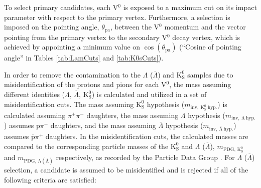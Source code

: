\documentclass[ALICE,manyauthors]{cernphprep}
\newcommand{\Lam}{$\Lambda$\xspace}
\newcommand{\ALam}{$\overline{\Lambda}$\xspace}
\newcommand{\LamALam}{$\Lambda$ ($\overline{\Lambda}$)\xspace}
\newcommand{\Ks}{$\mathrm{K^{0}_{S}}$\xspace}
\newcommand{\Vz}{V$^{0}$\xspace}
\begin{document}
To select primary candidates, each \Vz is exposed to a maximum cut on its impact parameter with respect to the primary vertex.
Furthermore, a selection is imposed on the pointing angle, $\theta_{\mathrm{pa}}$, between the \Vz momentum and the vector pointing from the primary vertex to the secondary \Vz decay vertex, which is achieved by appointing a minimum value on $\cos(\theta_{\mathrm{pa}})$ (``Cosine of pointing angle'' in Tables \ref{tab:LamCuts} and \ref{tab:K0sCuts}).

\begin{comment}
In order to remove the contamination to the \LamALam and \Ks samples due to misidentification of the protons and pions for each \Vz, the mass assuming different identities (\Lam, \ALam, \Ks)\footnote[1]
{
For the misidentification cuts, the mass assuming \Ks hypothesis ($m_{\mathrm{inv,~ K^{0}_{S}~ hyp.}}$) is calculated assuming $\pi^{+}\pi^{-}$ daughters, the mass assuming \Lam hypothesis ($m_{\mathrm{inv,~ \Lambda~ hyp.}}$) is calculated assuming p$\pi^{-}$ daughters, and the mass assuming \ALam hypothesis ($m_{\mathrm{inv,~ \overline{\Lambda}~ hyp.}}$) is calculated assuming $\overline{\mathrm{p}}\pi^{+}$ daughters. 
Additionally, $m_{\mathrm{PDG,\,K^{0}_{S}}}$ and $m_{\mathrm{PDG,\,\Lambda(\overline{\Lambda})}}$ denote the particle masses of the \Ks and \LamALam, respectively, as recorded by the Particle Data Group \cite{PhysRevD.98.030001}.
}
is calculated and utilized in a set of misidentification cuts.
For \LamALam selection, a candidate is assumed to be misidentified and is rejected if all of the following criteria are satisfied:
\end{comment}

In order to remove the contamination to the \LamALam and \Ks samples due to misidentification of the protons and pions for each \Vz, the mass assuming different identities (\Lam, \ALam, \Ks) is calculated and utilized in a set of misidentification cuts.
The mass assuming \Ks hypothesis ($m_{\mathrm{inv,~ K^{0}_{S}~ hyp.}}$) is calculated assuming $\pi^{+}\pi^{-}$ daughters, the mass assuming \Lam hypothesis ($m_{\mathrm{inv,~ \Lambda~ hyp.}}$) assumes p$\pi^{-}$ daughters, and the mass assuming \ALam hypothesis ($m_{\mathrm{inv,~ \overline{\Lambda}~ hyp.}}$) assumes $\overline{\mathrm{p}}\pi^{+}$ daughters. 
In the misidentification cuts, the calculated masses are compared to the corresponding particle masses of the \Ks and \LamALam, $m_{\mathrm{PDG,\,K^{0}_{S}}}$ and $m_{\mathrm{PDG,\,\Lambda(\overline{\Lambda})}}$ respectively, as recorded by the Particle Data Group \cite{PhysRevD.98.030001}.
For \LamALam selection, a candidate is assumed to be misidentified and is rejected if all of the following criteria are satisfied:
\end{document}
